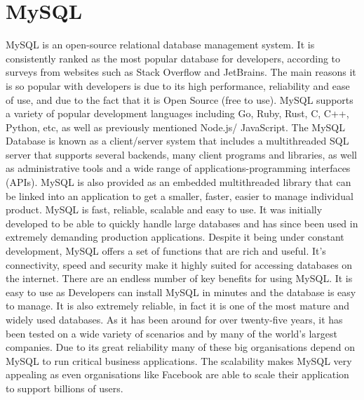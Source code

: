 \section{MySQL}
MySQL is an open-source relational database management system. \cite{sql} It is consistently ranked as the most popular database for developers, according to surveys from websites such as Stack Overflow and JetBrains. The main reasons it is so popular with developers is due to its high performance, reliability and ease of use, and due to the fact that it is Open Source (free to use). MySQL supports a variety of popular development languages including Go, Ruby, Rust, C, C++, Python, etc, as well as previously mentioned Node.js/ JavaScript.
\newline \newline
The MySQL Database is known as a client/server system that includes a multithreaded SQL server that supports several backends, many client programs and libraries, as well as administrative tools and a wide range of applications-programming interfaces (APIs). MySQL is also provided as an embedded multithreaded library that can be linked into an application to get a smaller, faster, easier to manage individual product.
\newline \newline
MySQL is fast, reliable, scalable and easy to use. It was initially developed to be able to quickly handle large databases and has since been used in extremely demanding production applications. Despite it being under constant development, MySQL offers a set of functions that are rich and useful. It’s connectivity, speed and security make it highly suited for accessing databases on the internet. 
\newline \newline
There are an endless number of key benefits \cite{sqlAd&Disad} for using MySQL. It is easy to use as Developers can install MySQL in minutes and the database is easy to manage. It is also extremely reliable, in fact it is one of the most mature and widely used databases. As it has been around for over twenty-five years, it has been tested on a wide variety of scenarios and by many of the world’s largest companies. Due to its great reliability many of these big organisations depend on MySQL to run critical business applications. The scalability makes MySQL very appealing as even organisations like Facebook are able to scale their application to support billions of users. 
\newline \newline
